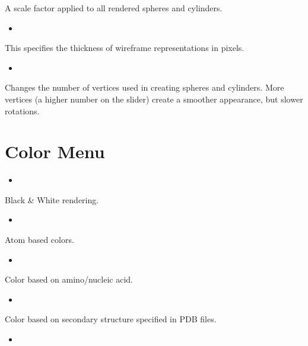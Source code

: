 \documentclass[letterpaper,11pt,english]{sphinxmanual}
\begin{document}
A scale factor applied to all rendered spheres and cylinders.
\begin{itemize}
\item {} 

\end{itemize}

This specifies the thickness of wireframe representations in pixels.
\begin{itemize}
\item {} 

\end{itemize}

Changes the number of vertices used in creating spheres and cylinders. More vertices (a higher number on the slider) create a smoother appearance, but slower rotations.


\section{Color Menu}
\label{\detokenize{text/menus:color-menu}}\begin{itemize}
\item {} 

\end{itemize}

Black \& White rendering.
\begin{itemize}
\item {} 

\end{itemize}

Atom based colors.
\begin{itemize}
\item {} 

\end{itemize}

Color based on amino/nucleic acid.
\begin{itemize}
\item {} 

\end{itemize}

Color based on secondary structure specified in PDB files.
\begin{itemize}
\item {} 

\end{itemize}
\end{document}
